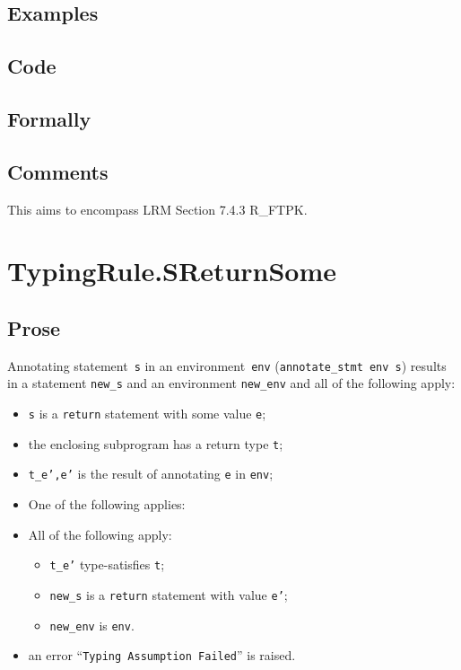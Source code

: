 \documentclass{book}
\begin{document}
  \subsection{Examples}

  \subsection{Code}

  \subsection{Formally}

  \subsection{Comments}
    This aims to encompass LRM Section 7.4.3 R\_FTPK.
    
\section{TypingRule.SReturnSome \label{sec:TypingRule.SReturnSome}}

  \subsection{Prose}
Annotating statement~\texttt{s} in an environment~\texttt{env}
(\texttt{annotate\_stmt env s}) results in a statement \texttt{new\_s} and an
environment \texttt{new\_env} and all of the following apply:
   \begin{itemize}
   \item \texttt{s} is a \texttt{return} statement with some value \texttt{e};
   \item the enclosing subprogram has a return type \texttt{t};
   \item \texttt{t\_e',e'} is the result of annotating \texttt{e} in \texttt{env};
   \item One of the following applies:
     \item All of the following apply:
       \begin{itemize}
       \item \texttt{t\_e'} type-satisfies \texttt{t};
       \item \texttt{new\_s} is a \texttt{return} statement with value \texttt{e'};
       \item \texttt{new\_env} is \texttt{env}. 
       \end{itemize}
     \item an error ``\texttt{Typing Assumption Failed}'' is raised.
   \end{itemize}
\end{document}
